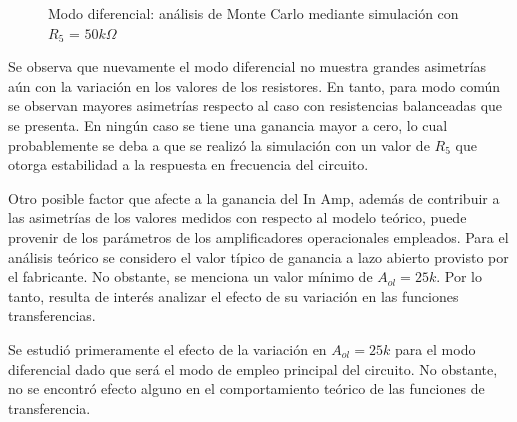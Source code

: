   \begin{figure}[H]
    \centering
    \hfill
    \caption{Modo diferencial: análisis de Monte Carlo mediante simulación con $R_{5}$ = $50k\Omega$}
  \end{figure}

Se observa que nuevamente el modo diferencial no muestra grandes asimetrías aún con la variación en los valores de los resistores. En tanto, para modo común se observan mayores asimetrías respecto al caso con 
resistencias balanceadas que se presenta. En ningún caso se tiene una ganancia mayor a cero, lo cual probablemente se deba a que se realizó la simulación con un valor de $R_{5}$ que otorga estabilidad a la respuesta en frecuencia del circuito. 


Otro posible factor que afecte a la ganancia del In Amp, además de contribuir a las asimetrías de los valores medidos con respecto al modelo teórico, puede provenir de los parámetros 
de los amplificadores operacionales empleados. Para el análisis teórico se considero el valor típico de ganancia a lazo abierto
provisto por el fabricante. No obstante, se menciona un valor mínimo de $A_{ol}=25k$. Por lo tanto, resulta de interés analizar el efecto de su variación en las funciones transferencias. 

Se estudió primeramente el efecto de la variación en $A_{ol}=25k$ para el modo diferencial dado que será el modo de empleo principal del circuito. No obstante, no se encontró efecto alguno en el comportamiento
teórico de las funciones de transferencia. 

